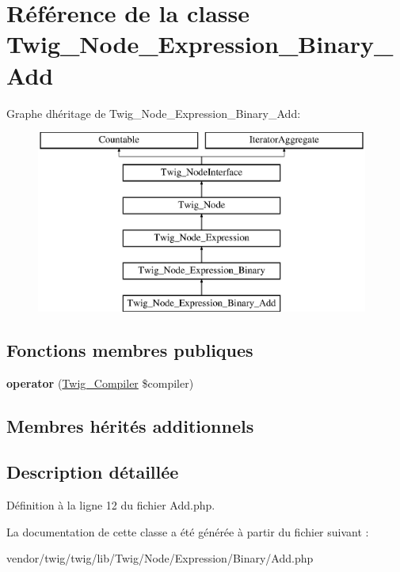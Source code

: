 \hypertarget{class_twig___node___expression___binary___add}{}\section{Référence de la classe Twig\+\_\+\+Node\+\_\+\+Expression\+\_\+\+Binary\+\_\+\+Add}
\label{class_twig___node___expression___binary___add}
Graphe d\textquotesingle{}héritage de Twig\+\_\+\+Node\+\_\+\+Expression\+\_\+\+Binary\+\_\+\+Add\+:\begin{figure}[H]
\begin{center}
\leavevmode
\includegraphics[height=6.000000cm]{class_twig___node___expression___binary___add}
\end{center}
\end{figure}
\subsection*{Fonctions membres publiques}
\begin{DoxyCompactItemize}
\item 
{\bfseries operator} (\hyperlink{class_twig___compiler}{Twig\+\_\+\+Compiler} \$compiler)\hypertarget{class_twig___node___expression___binary___add_af77318ec88d5f8a508684970a150b670}{}\label{class_twig___node___expression___binary___add_af77318ec88d5f8a508684970a150b670}

\end{DoxyCompactItemize}
\subsection*{Membres hérités additionnels}


\subsection{Description détaillée}


Définition à la ligne 12 du fichier Add.\+php.



La documentation de cette classe a été générée à partir du fichier suivant \+:\begin{DoxyCompactItemize}
\item 
vendor/twig/twig/lib/\+Twig/\+Node/\+Expression/\+Binary/Add.\+php\end{DoxyCompactItemize}
